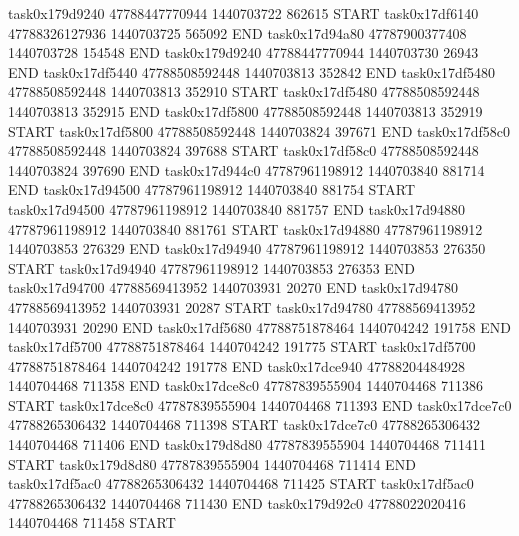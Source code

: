 task0x179d9240 47788447770944          1440703722               862615  START
task0x17df6140 47788326127936          1440703725               565092  END
task0x17d94a80 47787900377408          1440703728               154548  END
task0x179d9240 47788447770944          1440703730                26943  END
task0x17df5440 47788508592448          1440703813               352842  END
task0x17df5480 47788508592448          1440703813               352910  START
task0x17df5480 47788508592448          1440703813               352915  END
task0x17df5800 47788508592448          1440703813               352919  START
task0x17df5800 47788508592448          1440703824               397671  END
task0x17df58c0 47788508592448          1440703824               397688  START
task0x17df58c0 47788508592448          1440703824               397690  END
task0x17d944c0 47787961198912          1440703840               881714  END
task0x17d94500 47787961198912          1440703840               881754  START
task0x17d94500 47787961198912          1440703840               881757  END
task0x17d94880 47787961198912          1440703840               881761  START
task0x17d94880 47787961198912          1440703853               276329  END
task0x17d94940 47787961198912          1440703853               276350  START
task0x17d94940 47787961198912          1440703853               276353  END
task0x17d94700 47788569413952          1440703931                20270  END
task0x17d94780 47788569413952          1440703931                20287  START
task0x17d94780 47788569413952          1440703931                20290  END
task0x17df5680 47788751878464          1440704242               191758  END
task0x17df5700 47788751878464          1440704242               191775  START
task0x17df5700 47788751878464          1440704242               191778  END
task0x17dce940 47788204484928          1440704468               711358  END
task0x17dce8c0 47787839555904          1440704468               711386  START
task0x17dce8c0 47787839555904          1440704468               711393  END
task0x17dce7c0 47788265306432          1440704468               711398  START
task0x17dce7c0 47788265306432          1440704468               711406  END
task0x179d8d80 47787839555904          1440704468               711411  START
task0x179d8d80 47787839555904          1440704468               711414  END
task0x17df5ac0 47788265306432          1440704468               711425  START
task0x17df5ac0 47788265306432          1440704468               711430  END
task0x179d92c0 47788022020416          1440704468               711458  START
